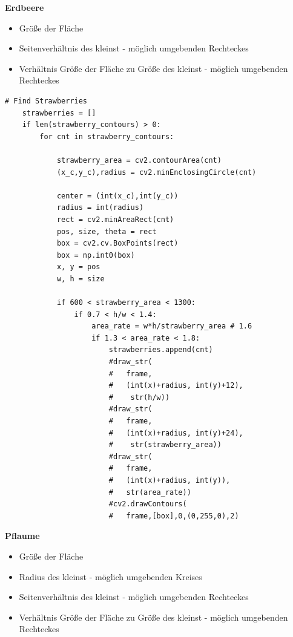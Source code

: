 \textbf{Erdbeere}

\begin{itemize}
    \item Größe der Fläche
    \item Seitenverhältnis des kleinst - möglich umgebenden Rechteckes
    \item Verhältnis Größe der Fläche zu Größe des kleinst - möglich umgebenden Rechteckes
\end{itemize}
\lstset{language=Python}
\begin{lstlisting}[]
# Find Strawberries
    strawberries = []
    if len(strawberry_contours) > 0:
        for cnt in strawberry_contours:

            strawberry_area = cv2.contourArea(cnt)
            (x_c,y_c),radius = cv2.minEnclosingCircle(cnt)

            center = (int(x_c),int(y_c))
            radius = int(radius)
            rect = cv2.minAreaRect(cnt)
            pos, size, theta = rect
            box = cv2.cv.BoxPoints(rect)
            box = np.int0(box)
            x, y = pos
            w, h = size
            
            if 600 < strawberry_area < 1300:
                if 0.7 < h/w < 1.4:
                    area_rate = w*h/strawberry_area # 1.6
                    if 1.3 < area_rate < 1.8:
                        strawberries.append(cnt)
                        #draw_str(
                        #   frame,
                        #   (int(x)+radius, int(y)+12),
                        #    str(h/w))
                        #draw_str(
                        #   frame,
                        #   (int(x)+radius, int(y)+24),
                        #    str(strawberry_area))
                        #draw_str(
                        #   frame,
                        #   (int(x)+radius, int(y)), 
                        #   str(area_rate))
                        #cv2.drawContours(
                        #   frame,[box],0,(0,255,0),2)
\end{lstlisting}
\textbf{Pflaume}

\begin{itemize}
    \item Größe der Fläche
    \item Radius des kleinst - möglich umgebenden Kreises
    \item Seitenverhältnis des kleinst - möglich umgebenden Rechteckes
     \item Verhältnis Größe der Fläche zu Größe des kleinst - möglich umgebenden Rechteckes
\end{itemize}

